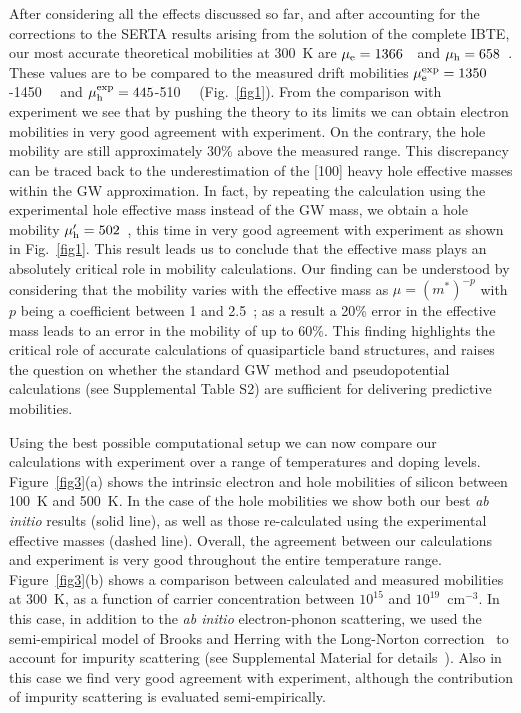 \documentclass[aps,prl,twocolumn,superscriptaddress]{revtex4-1}
\begin{document}
After considering all the effects discussed so far, and after accounting for the corrections to the SERTA
results arising from the solution of the complete IBTE, our most accurate theoretical mobilities
at 300~K are $\mu_{\rm e} = 1366$~\mobun\ and $\mu_{\rm h} = 658$~\mobun.  
These values are to be compared to the measured drift mobilities $\mu_{\rm e}^{\rm exp} = 1350$-1450~\mobun\
\cite{Ludwig1956,Cronemeyer1957,Li1977,Jacoboni1977} 
and $\mu_{\rm h}^{\rm exp} = 445$-510~\mobun\ \cite{Dorkel1981,Jacoboni1977,Ludwig1956,Cronemeyer1957} 
(Fig.~\ref{fig1}). From the comparison with experiment
we see that by pushing the theory to its limits we can obtain electron mobilities in very good agreement
with experiment. On the contrary, the hole mobility are still approximately 30\% above the
measured range. This discrepancy can be traced back to the underestimation of the [100] heavy hole
effective masses within the GW approximation. In fact, by repeating the calculation using the 
experimental hole effective mass instead of the GW mass, we obtain a hole mobility $\mu_{\rm h}^\prime 
= 502$~\mobun, this time in very good agreement with experiment as shown in Fig.~\ref{fig1}. 
This result leads us to conclude 
that the effective mass plays an absolutely critical role in mobility calculations. Our finding can be understood
by considering that the mobility varies with the effective mass as $\mu = (m^*)^{-p}$ with $p$ 
being a coefficient between 1 and 2.5~\cite{Bardeen1950,Blatt1957,Keyes1959}; as a result a 20\% error
 in the effective mass leads to an
error in the mobility of up to 60\%. This finding highlights the critical role of accurate
calculations of quasiparticle band structures, and raises the question on whether the standard GW
method and pseudopotential calculations (see Supplemental Table S2) are 
sufficient for delivering predictive mobilities.

Using the best possible computational setup we can now compare our calculations with experiment
over a range of temperatures and doping levels. Figure~\ref{fig3}(a) shows the intrinsic electron
and hole mobilities of silicon between 100~K and 500~K. In the case of the hole mobilities
we show both our best {\it ab initio} results (solid line), as well as those re-calculated using 
the experimental effective masses (dashed line). Overall, the agreement between our calculations
and experiment is very good throughout the entire temperature range. Figure~\ref{fig3}(b) shows
a comparison between calculated and measured mobilities at 300~K, as a function of carrier concentration
between $10^{15}$ and $10^{19}$~cm$^{-3}$.
In this case, in addition to the \textit{ab initio} electron-phonon scattering, 
we used the semi-empirical model of Brooks and Herring
with the Long-Norton correction~\cite{Brooks1951,Li1977} to account for impurity scattering
(see Supplemental Material for details~\cite{SI}). 
Also in this case we find very good agreement with experiment, although the contribution 
of impurity scattering is evaluated semi-empirically. 
\end{document}
